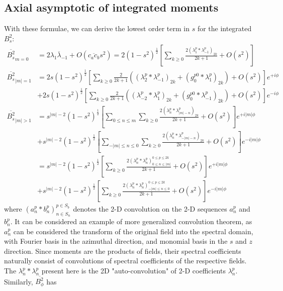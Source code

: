\documentclass[a4paper, 11pt]{article}
\begin{document}
\subsection{Axial asymptotic of integrated moments}

With these formulae, we can derive the lowest order term in $s$ for the integrated $B_s^2$:
\begin{equation}
    \begin{aligned}
        \overline{B_s^2}_{m=0} &= 2 \overline{\lambda_1 \lambda_{-1}} + O\left(\overline{c_a c_b} s^2\right) = 2\left(1 - s^2\right)^{\frac{1}{2}} \left[\sum_{k\geq 0} \frac{2 (\lambda_1^p * \lambda_{-1}^p)_{2k}}{2k+1} + O\left(s^2\right)\right] \\ 
        \overline{B_s^2}_{|m|=1} &= 2 s \left(1 - s^2\right)^{\frac{1}{2}} \left[\sum_{k\geq 0} \frac{2}{2k+1} \left((\lambda_2^p * \lambda_{-1}^p)_{2k} + (g_0^{p0} * \lambda_{1}^p)_{2k}\right) + O\left(s^2\right)\right] e^{+i\phi} \\ 
        &+ 2 s \left(1 - s^2\right)^{\frac{1}{2}} \left[\sum_{k\geq 0} \frac{2}{2k+1} \left((\lambda_{-2}^p * \lambda_{1}^p)_{2k} + (g_0^{p0} * \lambda_{-1}^p)_{2k}\right) + O\left(s^2\right)\right] e^{-i\phi} \\
        \overline{B_s^2}_{|m|>1} &= s^{|m|-2} \left(1 - s^2\right)^{\frac{1}{2}} \left[\sum_{0\leq n \leq m} \sum_{k\geq 0} \frac{2(\lambda_n^p * \lambda_{|m|-n}^p)_{2k}}{2k+1} + O\left(s^2\right)\right] e^{+i|m|\phi} \\ 
        &+ s^{|m|-2} \left(1 - s^2\right)^{\frac{1}{2}} \left[\sum_{-|m|\leq n \leq 0} \sum_{k\geq 0} \frac{2(\lambda_n^p * \lambda_{-|m|-n}^p)_{2k}}{2k+1} + O\left(s^2\right)\right] e^{-i|m|\phi} \\
        &= s^{|m|-2} \left(1 - s^2\right)^{\frac{1}{2}} \left[\sum_{k\geq 0} \frac{2(\lambda_n^p * \lambda_{n}^p)_{0\leq n \leq |m|}^{0\leq p \leq 2k}}{2k+1} + O\left(s^2\right)\right] e^{+i|m|\phi} \\ 
        &+ s^{|m|-2} \left(1 - s^2\right)^{\frac{1}{2}} \left[\sum_{k\geq 0} \frac{2(\lambda_n^p * \lambda_{n}^p)_{-|m|\leq n \leq 0}^{0\leq p \leq 2k}}{2k+1} + O\left(s^2\right)\right] e^{-i|m|\phi}
    \end{aligned}
\end{equation}
where $(a_n^p * b_n^p)_{n\in S_n}^{p \in S_b}$ denotes the 2-D convolution on the 2-D sequences $a_n^p$ and $b_n^p$. It can be considered an example of more generalized convolution theorem, as $a_n^p$ can be considered the transform of the original field into the spectral domain, with Fourier basis in the azimuthal direction, and monomial basis in the $s$ and $z$ direction. Since moments are the products of fields, their spectral coefficients naturally consist of convolutions of spectral coefficients of the respective fields. The $\lambda_n^p * \lambda_n^p$ present here is the 2D "auto-convolution" of 2-D coefficients $\lambda_n^p$. Similarly, $\overline{B_\phi^2}$ has
\end{document}
